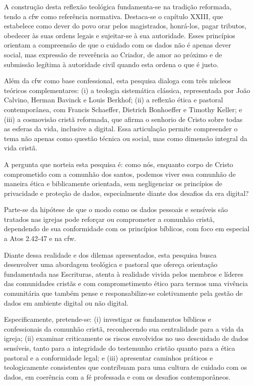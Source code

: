 A construção desta reflexão teológica fundamenta-se na tradição reformada, tendo a \gls{cfw} como referência normativa. Destaca-se o capítulo XXIII, que estabelece como dever do povo orar pelos magistrados, honrá-los, pagar tributos, obedecer às suas ordens legais e sujeitar-se à sua autoridade. Esses princípios orientam a compreensão de que o cuidado com os dados não é apenas dever social, mas expressão de reverência ao Criador, de amor ao próximo e de submissão legítima à autoridade civil quando esta ordena o que é justo.

Além da \gls{cfw} como base confessional, esta pesquisa dialoga com três núcleos teóricos complementares: (i) a teologia sistemática clássica, representada por João Calvino, Herman Bavinck e Louis Berkhof; (ii) a reflexão ética e pastoral contemporânea, com Francis Schaeffer, Dietrich Bonhoeffer e Timothy Keller; e (iii) a cosmovisão cristã reformada, que afirma o senhorio de Cristo sobre todas as esferas da vida, inclusive a digital. Essa articulação permite compreender o tema não apenas como questão técnica ou social, mas como dimensão integral da vida cristã.

A pergunta que norteia esta pesquisa é: como nós, enquanto corpo de Cristo comprometido com a comunhão dos santos, podemos viver essa comunhão de maneira ética e biblicamente orientada, sem negligenciar os princípios de privacidade e proteção de dados, especialmente diante dos desafios da era digital?

Parte-se da hipótese de que o modo como os dados pessoais e sensíveis são tratados nas igrejas pode reforçar ou comprometer a comunhão cristã, dependendo de sua conformidade com os princípios bíblicos, com foco em especial a Atos 2.42-47 e na \gls{cfw}.

Diante dessa realidade e dos dilemas apresentados, esta pesquisa busca desenvolver uma abordagem teológica e pastoral que ofereça orientação fundamentada nas Escrituras, atenta à realidade vivida pelos membros e líderes das comunidades cristãs e com comprometimento ético para termos uma vivência comunitária que também pense e responsabilize-se coletivamente pela gestão de dados em ambiente digital ou não digital.

Especificamente, pretende-se: (i) investigar os fundamentos bíblicos e confessionais da comunhão cristã, reconhecendo sua centralidade para a vida da igreja; (ii) examinar criticamente os riscos envolvidos no uso descuidado de dados sensíveis, tanto para a integridade do testemunho cristão quanto para a ética pastoral e a conformidade legal; e (iii) apresentar caminhos práticos e teologicamente consistentes que contribuam para uma cultura de cuidado com os dados, em coerência com a fé professada e com os desafios contemporâneos.

